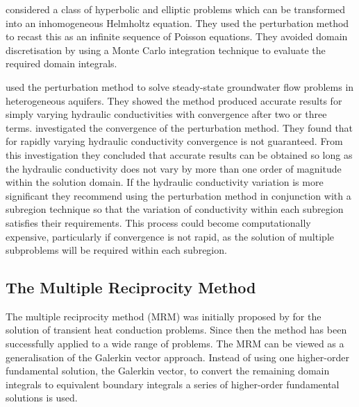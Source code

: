 \citet{gipson:1987b} considered a class of hyperbolic and elliptic
problems which can be transformed into an inhomogeneous Helmholtz equation.
They used the perturbation method to recast this as an infinite sequence of
Poisson equations. They avoided domain discretisation by using a Monte
Carlo integration technique \citep{gipson:1987} to evaluate the required
domain integrals.

\citet{lafe:1987} used the perturbation method to solve
steady-state groundwater flow problems in heterogeneous aquifers.  They
showed the method produced accurate results for simply varying hydraulic
conductivities with convergence after two or three terms.
\citet{lafe:1987} investigated the convergence of the perturbation
method.  They found that for rapidly varying hydraulic conductivity
convergence is not guaranteed.  From this investigation they concluded that
accurate results can be obtained so long as the hydraulic conductivity does
not vary by more than one order of magnitude within the solution domain.
If the hydraulic conductivity variation is more significant they recommend
using the perturbation method in conjunction with a subregion technique so
that the variation of conductivity within each subregion satisfies their
requirements.  This process could become computationally expensive,
particularly if convergence is not rapid, as the solution of multiple
subproblems will be required within each subregion.

\subsection{The Multiple Reciprocity Method}

The multiple reciprocity method 
  (MRM) was
initially proposed by \citet{nowak:1987} for the solution of transient
heat conduction problems.  Since then the method has been successfully applied
to a wide range of problems.  The MRM can be viewed as a generalisation of the
Galerkin vector approach.  Instead of using one higher-order fundamental
solution, the Galerkin vector, to convert the remaining domain integrals to
equivalent boundary integrals a series of higher-order fundamental solutions
is used.

